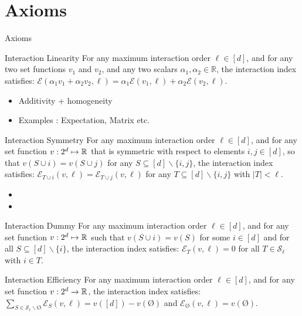 \documentclass[10pt]{beamer}
\newcommand{\f}{v}
\newcommand{\ex}{\Expl}
\def\Expl{\mathcal{E}}
\begin{document}
\section[Axioms]{Axioms}

\begin{frame}{Axioms}
    \begin{myaxiombox}{Interaction Linearity}
    For any maximum interaction order $\ell \in [d]$, and for any two set functions $\f_1$ and $\f_2$, and any two scalars $\alpha_1, \alpha_2 \in \mathbb{R}$, the interaction index satisfies: $\ex(\alpha_1 \f_1+ \alpha_2 \f_2,\ell) = \alpha_1 \ex(\f_1,\ell) + \alpha_2 \ex(\f_2,\ell)$.
    \end{myaxiombox}
    \begin{itemize}[label=\scalebox{0.5}{$\blacksquare$}]
        \item Additivity + homogeneity
        \item Examples : Expectation, Matrix etc.
    \end{itemize}
\end{frame}
\begin{frame}
    \begin{myaxiombox}{Interaction Symmetry}
        For any maximum interaction order $\ell \in [d]$, and for any set function $\f:2^d \mapsto \R$ that is symmetric with respect to elements $i, j \in [d]$, so that
$\f(S \! \cup  i) = \f(S \! \cup  j) \!$ for any $S \subseteq [d] \backslash \{i,j\}$, the interaction index satisfies: $\ex_{T \cup i}(\f,\ell) = \ex_{ T \cup j}(\f,\ell)$ for any $T \subseteq [d] \backslash \{i,j\}$ with $|T| < \ell$.
    \end{myaxiombox}
        \begin{itemize}[label=\scalebox{0.5}{$\blacksquare$}]
        \item 
        \item 
    \end{itemize}
\end{frame}


\begin{frame}
    \begin{myaxiombox}{Interaction Dummy}
        For any maximum interaction order $\ell \in [d]$, and for any set function $\f:2^d \mapsto \R$ such that $\f(S \cup i) = \f(S)$ for some $i \in [d]$ and for all $ S \subseteq [d] \backslash \{i\}$, the interaction index satisfies:  $\ex_{T}(\f, \ell) = 0$ for all $T \in \mathcal{S}_\ell$ with $i \in T$.
    \end{myaxiombox}
\end{frame}
\begin{frame}
    \begin{myaxiombox}{Interaction Efficiency}
        For any maximum interaction order $\ell \in [d]$, and for any set function $\f:2^d \rightarrow \R$, the interaction index satisfies: $\sum_{S \in \mathcal{S}_\ell\backslash\text{\O}} \ex_S(\f,\ell) = \f([d]) - \f(\text{\O})$ and $\ex_{\text{\O}}(\f,\ell) = \f(\text{\O})$.
    \end{myaxiombox}
\end{frame}
\end{document}
